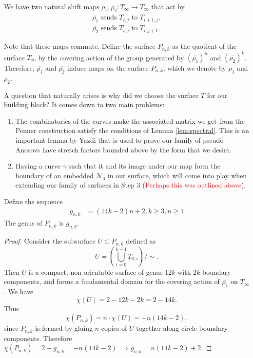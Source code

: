 We have two natural shift maps $\overline{\rho_1},\overline{\rho_2}: T_\infty \xrightarrow[]{} T_\infty$ that act by
\begin{gather*}
    \overline{\rho_1} \text{ sends } T_{i,j} \text{ to } T_{i+1,j}, \\
    \overline{\rho_2} \text{ sends } T_{i,j} \text{ to } T_{i,j+1}.
\end{gather*}

Note that these maps commute. Define the surface $P_{n,k}$ as the quotient of the surface $T_\infty$ by the covering action of the group generated by $(\overline{\rho_1})^n$ and $(\overline{\rho_2})^k$. Therefore, $\overline{\rho_1}$ and $\overline{\rho_2}$ induce maps on the surface $P_{n,k}$, which we denote by $\rho_1$ and $\rho_2$.

A question that naturally arises is why did we choose the surface $T$ for our building block? It comes down to two main problems:
\begin{enumerate}
    \item The combinatorics of the curves make the associated matrix we get from the Penner construction satisfy the conditions of Lemma \ref{lem:spectral}. This is an important lemma by Yazdi that is used to prove our family of pseudo-Anosovs have stretch factors bounded above by the form that we desire.
    \item Having a curve $\gamma$ such that it and its image under our map form the boundary of an embedded $\mathcal{N}_3$ in our surface, which will come into play when extending our family of surfaces in Step 3 (\textcolor{red}{Perhaps this was outlined above}).
\end{enumerate}

\begin{lem}
\label{lem:genera}
Define the sequence
\begin{align*}
    g_{n,k} &= (14k - 2)n + 2, k \geq 3, n \geq 1
\end{align*}
    The genus of $P_{n,k}$ is $g_{n,k}$.
\end{lem}
\begin{proof}
    Consider the subsurface $U \subset P_{n,k}$ defined as $$U = \left( \bigcup_{i =0}^{k-1} T_{0,i} \right)/\sim.$$ Then $U$ is a compact, non-orientable surface of genus $12k$ with $2k$ boundary components, and forms a fundamental domain for the covering action of $\overline{\rho_1}$ on $T_\infty$. We have $$\chi(U) = 2 - 12k - 2k = 2 - 14k.$$ Thus $$\chi(P_{n,k}) = n \cdot \chi(U) = -n(14k - 2),$$ since $P_{n,k}$ is formed by gluing $n$ copies of $U$ together along circle boundary components. Therefore $\chi(P_{n,k}) = 2 - g_{n,k} = -n(14k - 2) \implies g_{n,k} = n(14k - 2) + 2$.
\end{proof}

